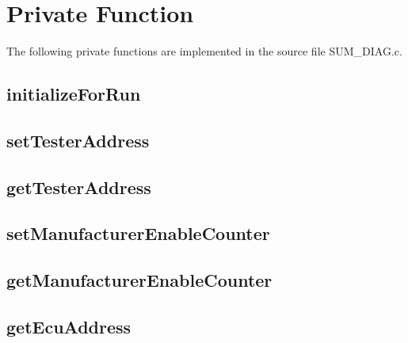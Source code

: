 \section{Private Function}

The following private functions are implemented in the source file SUM_DIAG.c.


\subsection{initializeForRun}

{

}
{     }

\subsection{setTesterAddress}

{

}
{}

\subsection{getTesterAddress}

{

}
{}

\subsection{setManufacturerEnableCounter}

{

}
{}

\subsection{getManufacturerEnableCounter}

{

}
{}

\subsection{getEcuAddress}

{

}
{}

